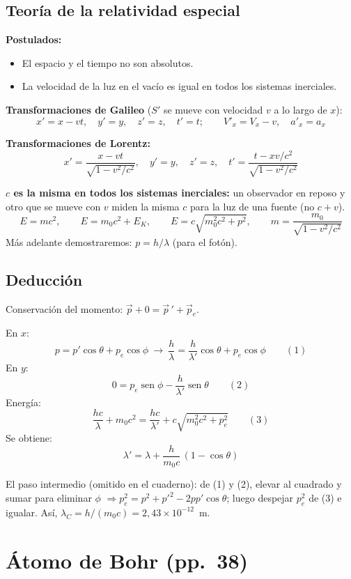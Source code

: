 \documentclass[11pt,a4paper]{article}
\newcommand{\pags}[1]{{\normalfont\small\color{gris}(pp.~#1)}}
\DeclareMathOperator{\sen}{sen}
\begin{document}
\subsection{Teoría de la relatividad especial}
\textbf{Postulados:}
\begin{itemize}
  \item El espacio y el tiempo no son absolutos.
  \item La velocidad de la luz en el vacío es igual en todos los sistemas inerciales.
\end{itemize}

\textbf{Transformaciones de Galileo} ($S'$ se mueve con velocidad $v$ a lo largo de $x$):
\[
x'=x-vt,\quad y'=y,\quad z'=z,\quad t'=t;\qquad V'_x=V_x-v,\quad a'_x=a_x
\]

\textbf{Transformaciones de Lorentz:}
\[
x'=\frac{x-vt}{\sqrt{1-v^2/c^2}},\quad y'=y,\quad z'=z,\quad t'=\frac{t-xv/c^2}{\sqrt{1-v^2/c^2}}
\]

\textbf{$c$ es la misma en todos los sistemas inerciales:} un observador en reposo y otro que se mueve con $v$
miden la misma $c$ para la luz de una fuente (no $c+v$).
\[
E=mc^2,\qquad E=m_0c^2+E_K,\qquad E=c\sqrt{m_0^2c^2+p^2},\qquad m=\frac{m_0}{\sqrt{1-v^2/c^2}}
\]
Más adelante demostraremos: $p=h/\lambda$ (para el fotón).

\subsection{Deducción}
Conservación del momento: $\vec p+0=\vec p\,'+\vec p_e$.

En $x$:
\[
p=p'\cos\theta+p_e\cos\phi\ \rightarrow\ \frac{h}{\lambda}=\frac{h}{\lambda'}\cos\theta+p_e\cos\phi \qquad (1)
\]
En $y$:
\[
0=p_e\sen\phi-\frac{h}{\lambda'}\sen\theta \qquad (2)
\]
Energía:
\[
\frac{hc}{\lambda}+m_0c^2=\frac{hc}{\lambda'}+c\sqrt{m_0^2c^2+p_e^2} \qquad (3)
\]
Se obtiene:
\[
\boxed{\lambda'=\lambda+\frac{h}{m_0c}\,(1-\cos\theta)}
\]

\begin{obs}
El paso intermedio (omitido en el cuaderno): de (1) y (2), elevar al cuadrado y sumar para eliminar $\phi$
$\Rightarrow p_e^2=p^2+p'^2-2pp'\cos\theta$; luego despejar $p_e^2$ de (3) e igualar.
Así, $\lambda_C=h/(m_0c)=2{,}43\times10^{-12}$~m.
\end{obs}

\section{Átomo de Bohr \pags{38}}
\end{document}
